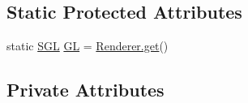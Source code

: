 \subsection*{Static Protected Attributes}
\begin{DoxyCompactItemize}
\item 
static \mbox{\hyperlink{interfaceorg_1_1newdawn_1_1slick_1_1opengl_1_1renderer_1_1_s_g_l}{S\+GL}} \mbox{\hyperlink{classorg_1_1newdawn_1_1slick_1_1state_1_1transition_1_1_select_transition_a6ae81bee49fb099f9e465690cc50ac9c}{GL}} = \mbox{\hyperlink{classorg_1_1newdawn_1_1slick_1_1opengl_1_1renderer_1_1_renderer_abe742c3a7dfca67c6c01821d27087308}{Renderer.\+get}}()
\end{DoxyCompactItemize}
\subsection*{Private Attributes}

